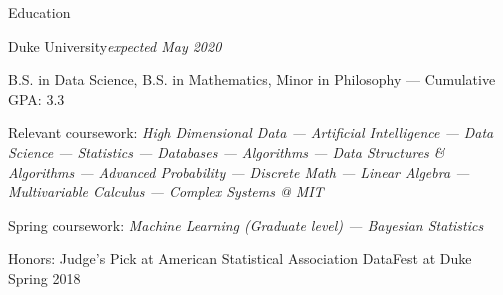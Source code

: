 \documentclass{resume} %
\begin{document}

\begin{rSection}{Education}

\begin{rSubsection}{Duke University}{\em expected May 2020}{}
\item  B.S. in Data Science, B.S. in Mathematics, Minor in Philosophy --- Cumulative GPA: 3.3
\item  Relevant coursework: {\em High Dimensional Data --- Artificial Intelligence --- Data Science --- Statistics --- Databases --- Algorithms --- Data Structures \& Algorithms --- Advanced Probability ---  Discrete Math  --- Linear Algebra --- Multivariable Calculus --- Complex Systems @ MIT}
\item Spring coursework: {\em Machine Learning (Graduate level) --- Bayesian Statistics}
\item Honors: Judge's Pick at American Statistical Association DataFest at Duke \hfill {Spring 2018}
\end{rSubsection}

\end{rSection}

\end{document}
